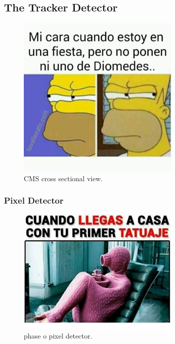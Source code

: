 \subsection{The Tracker Detector}


\begin{figure}[!h]
  \centering
  \includegraphics[width=0.7\textwidth]{../images/ch2/4}
  \caption[CMS cross sectional view]{CMS cross sectional view.}\label{fig:cms_layout}
\end{figure}


\subsubsection{Pixel Detector}


\begin{figure}[!h]
  \centering
  \includegraphics[width=0.7\textwidth]{../images/ch2/5}
  \caption[phase o pixel detector]{phase o pixel detector.}\label{fig:cms_layout}
\end{figure}



